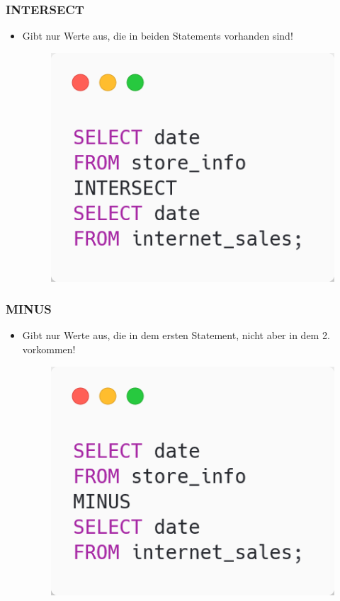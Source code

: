 \subsubsection{INTERSECT}
\begin{itemize}
    \item Gibt nur Werte aus, die in beiden Statements vorhanden sind!
    \begin{figure}[H]
        \centering
        \includegraphics[scale=.4]{res/themekorb_2/intersect.png} 
    \end{figure}
\end{itemize}

\subsubsection{MINUS}
\begin{itemize}
    \item Gibt nur Werte aus, die in dem ersten Statement, nicht aber in dem 2. vorkommen!
    \begin{figure}[H]
        \centering
        \includegraphics[scale=.4]{res/themekorb_2/minus.png} 
    \end{figure}
\end{itemize}

